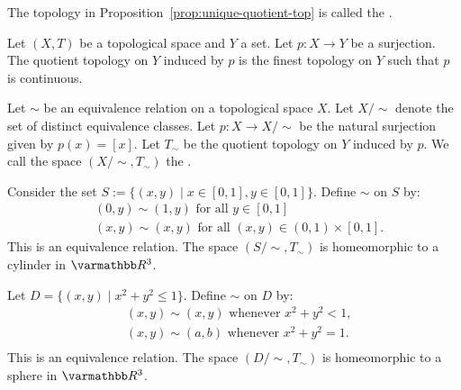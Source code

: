 \begin{definition}
    The topology in Proposition~\ref{prop:unique-quotient-top} is called the  .
\end{definition}

\begin{proposition}
    Let $(X,T)$ be a topological space and $Y$ a set. Let $p:X \rightarrow Y$ be a surjection. The quotient topology on $Y$ induced by $p$ is the finest topology on $Y$ such that $p$ is continuous.
\end{proposition}

\begin{definition}
    Let $\sim$ be an equivalence relation on a topological space $X$. Let $X /\sim$ denote the set of distinct equivalence classes. Let $p:X \rightarrow X/\sim$ be the natural surjection given by $p(x) = [x]$. Let $T_\sim$ be the quotient topology on $Y$ induced by $p$. We call the space $(X/\sim,T_\sim)$ the .
\end{definition}

\begin{example}
    Consider the set $S := \{(x,y) \mid x \in [0,1], y \in [0,1]\}$. Define $\sim$ on $S$ by:
        \begin{equation*}
        \begin{split}
            &(0,y) \sim (1,y) \text{ for all } y \in [0,1] \\
            &(x,y) \sim (x,y) \text{ for all }(x,y) \in (0,1) \times [0,1].
        \end{split}
        \end{equation*}
        This is an equivalence relation. The space $(S/\sim, T_\sim)$ is homeomorphic to a cylinder in $\bfR^3$.
\end{example}

\begin{example}
    Let $D = \{(x,y) \mid x^2 + y^2 \leq 1\}$. Define $\sim$ on $D$ by:
        \begin{equation*}
        \begin{split}
            &(x,y) \sim (x,y) \text{ whenever }x^2 + y^2 < 1,\\
            &(x,y) \sim (a,b) \text{ whenever }x^2 + y^2 = 1.\\
        \end{split}
        \end{equation*}
    This is an equivalence relation. The space $(D/\sim, T_\sim)$ is homeomorphic to a sphere in $\bfR^3$.
\end{example}

